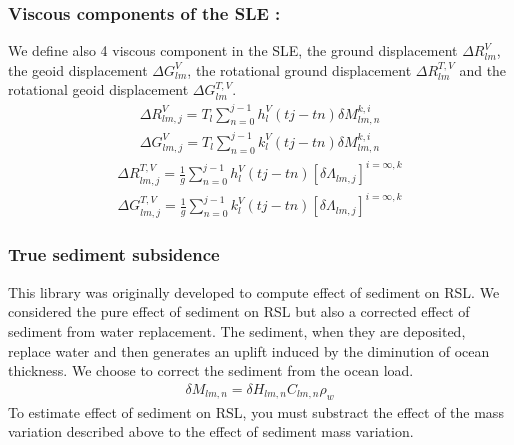 \documentclass[letterpaper,10pt,english]{sphinxmanual}
\begin{document}
\subsubsection{Viscous components of the SLE :}
\label{\detokenize{numerical_imp:viscous-components-of-the-sle}}
\sphinxAtStartPar
We define also 4 viscous component in the SLE, the ground displacement \(\Delta R^V_{lm}\), the geoid displacement \(\Delta G^V_{lm}\), the rotational ground displacement \(\Delta R^{T,V}_{lm}\) and the rotational geoid displacement \(\Delta G^{T,V}_{lm}\).
\begin{equation*}
\begin{split}\Delta R^V_{lm,j}=  T_l \sum_{n=0}^{j-1} h^V_l(tj-tn)\delta M_{lm,n}^{k,i}\end{split}
\end{equation*}\begin{equation*}
\begin{split}\Delta G^V_{lm,j}=  T_l \sum_{n=0}^{j-1} k^V_l(tj-tn)\delta M_{lm,n}^{k,i}\end{split}
\end{equation*}\begin{equation*}
\begin{split}\Delta R^{T,V}_{lm,j}=\frac{1}{g} \sum^{j-1}_{n=0} h^V_l(tj-tn)[\delta \Lambda_{lm,j}]^{i=\infty,k}\end{split}
\end{equation*}\begin{equation*}
\begin{split}\Delta G^{T,V}_{lm,j}=\frac{1}{g} \sum^{j-1}_{n=0} k^V_l(tj-tn)[\delta \Lambda_{lm,j}]^{i=\infty,k}\end{split}
\end{equation*}

\subsubsection{True sediment subsidence}
\label{\detokenize{numerical_imp:true-sediment-subsidence}}\label{\detokenize{numerical_imp:sed-subs}}
\sphinxAtStartPar
This library was originally developed to compute effect of sediment on RSL. We considered the pure effect of sediment on RSL but also a corrected effect of sediment from water replacement. The sediment, when they are deposited, replace water and then generates an uplift induced by the diminution of ocean thickness. We choose to correct the sediment from the ocean load.
\begin{equation*}
\begin{split}\delta M_{lm,n} = \delta H_{lm,n}C_{lm,n}\rho_w\end{split}
\end{equation*}
\sphinxAtStartPar
To estimate effect of sediment on RSL, you must substract the effect of the mass variation described above to the effect of sediment mass variation.
\end{document}
